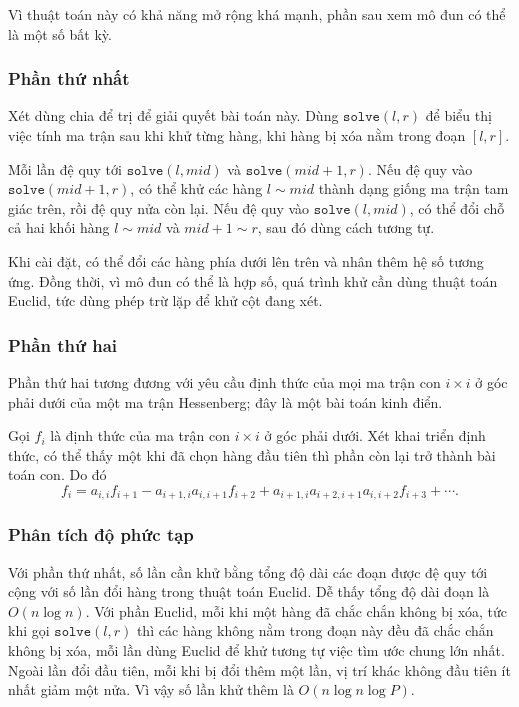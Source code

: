 \documentclass[11pt]{article}
\begin{document}
Vì thuật toán này có khả năng mở rộng khá mạnh, phần sau xem mô đun có thể là
một số bất kỳ.

\subsubsection{Phần thứ nhất}

Xét dùng chia để trị để giải quyết bài toán này. Dùng \(\texttt{solve}(l,r)\)
để biểu thị việc tính ma trận sau khi khử từng hàng, khi hàng bị xóa nằm trong
đoạn \([l,r]\).

Mỗi lần đệ quy tới \(\texttt{solve}(l,\mathit{mid})\) và
\(\texttt{solve}(\mathit{mid}+1,r)\). Nếu đệ quy vào
\(\texttt{solve}(\mathit{mid}+1,r)\), có thể khử các hàng \(l\sim\mathit{mid}\)
thành dạng giống ma trận tam giác trên, rồi đệ quy nửa còn lại. Nếu đệ quy vào
\(\texttt{solve}(l,\mathit{mid})\), có thể đổi chỗ cả hai khối hàng
\(l\sim\mathit{mid}\) và \(\mathit{mid}+1\sim r\), sau đó dùng cách tương tự.

Khi cài đặt, có thể đổi các hàng phía dưới lên trên và nhân thêm hệ số tương
ứng. Đồng thời, vì mô đun có thể là hợp số, quá trình khử cần dùng thuật toán
Euclid, tức dùng phép trừ lặp để khử cột đang xét.

\subsubsection{Phần thứ hai}

Phần thứ hai tương đương với yêu cầu định thức của mọi ma trận con \(i\times i\)
ở góc phải dưới của một ma trận Hessenberg; đây là một bài toán kinh điển.

Gọi \(f_i\) là định thức của ma trận con \(i\times i\) ở góc phải dưới. Xét khai
triển định thức, có thể thấy một khi đã chọn hàng đầu tiên thì phần còn lại trở
thành bài toán con. Do đó
\[
  f_i=a_{i,i}f_{i+1}
  -a_{i+1,i}a_{i,i+1}f_{i+2}
  +a_{i+1,i}a_{i+2,i+1}a_{i,i+2}f_{i+3}+\cdots.
\]

\subsubsection{Phân tích độ phức tạp}

Với phần thứ nhất, số lần cần khử bằng tổng độ dài các đoạn được đệ quy tới cộng
với số lần đổi hàng trong thuật toán Euclid. Dễ thấy tổng độ dài đoạn là
\(O(n\log n)\). Với phần Euclid, mỗi khi một hàng đã chắc chắn không bị xóa, tức
khi gọi \(\texttt{solve}(l,r)\) thì các hàng không nằm trong đoạn này đều đã
chắc chắn không bị xóa, mỗi lần dùng Euclid để khử tương tự việc tìm ước chung
lớn nhất. Ngoài lần đổi đầu tiên, mỗi khi bị đổi thêm một lần, vị trí khác không
đầu tiên ít nhất giảm một nửa. Vì vậy số lần khử thêm là
\(O(n\log n\log P)\).
\end{document}
